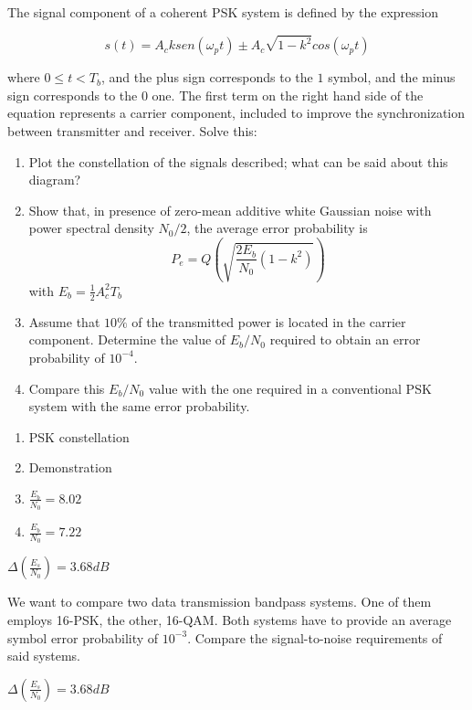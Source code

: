 \documentclass[idioma,boletin]{uah}
\begin{document}
{


	The signal component of a coherent PSK system is defined by the expression

\begin{displaymath}
	s(t) =A_c k sen(\omega_p t) \pm A_c \sqrt{1-k^2} cos(\omega_p t)
\end{displaymath}

where $0 \leq t < T_b$, and the plus sign corresponds to the $1$ symbol, and the minus sign corresponds to the $0$ one. The first term on the right hand side of the equation represents a carrier component, included to improve the synchronization between transmitter and receiver. Solve this:

\begin{enumerate}
	\item Plot the constellation of the signals described; what can be said about this diagram?
	\item Show that, in presence of zero-mean additive white Gaussian noise with power spectral density $N_0/2$, the average error probability is
	\begin{displaymath}
		P_e = Q \left ( \sqrt{\frac{2E_b}{N_0} (1-k^2)} \right )
	\end{displaymath}
	with $E_b = \frac{1}{2} A_c^2 T_b$
	\item Assume that $10\%$ of the transmitted power is located in the carrier component. Determine the value of $E_b/N_0$ required to obtain an error probability of $10^{-4}$.
	\item Compare this $E_b/N_0$ value with the one required in a conventional PSK system with the same error probability.
\end{enumerate}

}
{
\begin{enumerate}
	\item PSK constellation
	\item Demonstration
	\item $\frac{E_b}{N_0} = 8.02$
	\item $\frac{E_b}{N_0} = 7.22$
\end{enumerate}

}




{

$\Delta \left ( \frac{E_s}{N_0} \right ) = 3.68 dB$
}
{

We want to compare two data transmission bandpass systems. One of them employs 16-PSK, the other, 16-QAM. Both systems have to provide an average symbol error probability of $10^{-3}$. Compare the signal-to-noise requirements of said systems.
}
{

$\Delta \left ( \frac{E_s}{N_0} \right ) = 3.68 dB$
}
\end{document}
